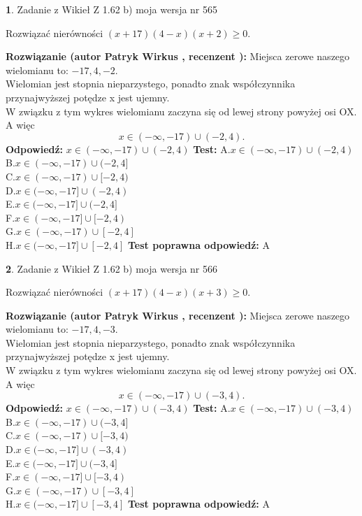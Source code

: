 \documentclass[12pt, a4paper]{article}
\theoremstyle{definition} %
\newtheorem{zad}{}
\newcommand{\zadStart}[1]{\begin{zad}#1\newline}
\newcommand{\zadStop}{\end{zad}}
\newcommand{\rozwStart}[2]{\noindent \textbf{Rozwiązanie (autor #1 , recenzent #2): }\newline}
\newcommand{\rozwStop}{\newline}
\newcommand{\odpStart}{\noindent \textbf{Odpowiedź:}\newline}
\newcommand{\odpStop}{\newline}
\newcommand{\testStart}{\noindent \textbf{Test:}\newline}
\newcommand{\testStop}{\newline}
\newcommand{\kluczStart}{\noindent \textbf{Test poprawna odpowiedź:}\newline}
\newcommand{\kluczStop}{\newline}
\begin{document}
\zadStart{Zadanie z Wikieł Z 1.62 b) moja wersja nr 565}

Rozwiązać nierówności $(x+17)(4-x)(x+2)\ge0$.
\zadStop
\rozwStart{Patryk Wirkus}{}
Miejsca zerowe naszego wielomianu to: $-17, 4, -2$.\\
Wielomian jest stopnia nieparzystego, ponadto znak współczynnika przy\linebreak najwyższej potędze x jest ujemny.\\ W związku z tym wykres wielomianu zaczyna się od lewej strony powyżej osi OX. A więc $$x \in (-\infty,-17) \cup (-2,4).$$
\rozwStop
\odpStart
$x \in (-\infty,-17) \cup (-2,4)$
\odpStop
\testStart
A.$x \in (-\infty,-17) \cup (-2,4)$\\
B.$x \in (-\infty,-17) \cup (-2,4]$\\
C.$x \in (-\infty,-17) \cup [-2,4)$\\
D.$x \in (-\infty,-17] \cup (-2,4)$\\
E.$x \in (-\infty,-17] \cup (-2,4]$\\
F.$x \in (-\infty,-17] \cup [-2,4)$\\
G.$x \in (-\infty,-17) \cup [-2,4]$\\
H.$x \in (-\infty,-17] \cup [-2,4]$
\testStop
\kluczStart
A
\kluczStop



\zadStart{Zadanie z Wikieł Z 1.62 b) moja wersja nr 566}

Rozwiązać nierówności $(x+17)(4-x)(x+3)\ge0$.
\zadStop
\rozwStart{Patryk Wirkus}{}
Miejsca zerowe naszego wielomianu to: $-17, 4, -3$.\\
Wielomian jest stopnia nieparzystego, ponadto znak współczynnika przy\linebreak najwyższej potędze x jest ujemny.\\ W związku z tym wykres wielomianu zaczyna się od lewej strony powyżej osi OX. A więc $$x \in (-\infty,-17) \cup (-3,4).$$
\rozwStop
\odpStart
$x \in (-\infty,-17) \cup (-3,4)$
\odpStop
\testStart
A.$x \in (-\infty,-17) \cup (-3,4)$\\
B.$x \in (-\infty,-17) \cup (-3,4]$\\
C.$x \in (-\infty,-17) \cup [-3,4)$\\
D.$x \in (-\infty,-17] \cup (-3,4)$\\
E.$x \in (-\infty,-17] \cup (-3,4]$\\
F.$x \in (-\infty,-17] \cup [-3,4)$\\
G.$x \in (-\infty,-17) \cup [-3,4]$\\
H.$x \in (-\infty,-17] \cup [-3,4]$
\testStop
\kluczStart
A
\kluczStop
\end{document}
